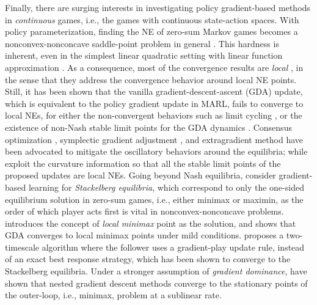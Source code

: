  
 Finally, there are surging interests  in investigating   
 policy gradient-based methods in \emph{continuous} games, i.e., the games with continuous state-action spaces. With policy parameterization, finding the NE of  zero-sum Markov games becomes   a nonconvex-nonconcave saddle-point  problem in general \cite{mazumdar2018convergence,mazumdar2019finding,zhang2019policyb,bu2019global}. This hardness is inherent, even in the simplest linear quadratic setting with linear function approximation \cite{zhang2019policyb,bu2019global}. As a consequence,     most of the convergence results are \emph{local}  \cite{mescheder2017numerics,mazumdar2018convergence,adolphs2018local,daskalakis2018limit,mertikopoulos2019optimistic,fiez2019convergence,mazumdar2019finding,jin2019minmax}, in the sense that they address  the convergence behavior around  local NE points. Still, it has been shown that the vanilla gradient-descent-ascent (GDA) update, which is equivalent to the policy gradient update in MARL, fails to converge to local NEs, for either the non-convergent behaviors such as limit cycling  \cite{mescheder2017numerics,daskalakis2018limit,balduzzi2018mechanics,mertikopoulos2019optimistic}, or the existence of non-Nash stable limit points for the GDA dynamics \cite{adolphs2018local,mazumdar2019finding}. Consensus optimization \cite{mescheder2017numerics},   symplectic gradient adjustment \cite{balduzzi2018mechanics}, and extragradient method   \cite{mertikopoulos2019optimistic} have been advocated to mitigate the oscillatory behaviors around the equilibria; while \cite{adolphs2018local,mazumdar2019finding} exploit the curvature information so that all the stable limit points of the proposed updates are local NEs. 
Going beyond Nash equilibria, \cite{jin2019minmax,fiez2019convergence} consider gradient-based learning for \emph{Stackelberg equilibria}, which correspond to only the one-sided equilibrium solution in zero-sum games, i.e., either minimax or maximin, as the order of which player acts first is vital in nonconvex-nonconcave problems.  
\cite{jin2019minmax} introduces the  concept of \emph{local minimax} point as the solution, and shows that GDA converges to  local minimax points under mild conditions.  
\cite{fiez2019convergence}  proposes a two-timescale algorithm where the follower uses a gradient-play update rule, instead of an exact best response strategy, which has been shown to converge to the Stackelberg equilibria. 
 Under a stronger assumption of \emph{gradient dominance}, \cite{sanjabi2018solving,nouiehed2019solving} have shown that nested gradient descent methods converge to the stationary points of the outer-loop, i.e., minimax, problem at a sublinear rate. 
 
